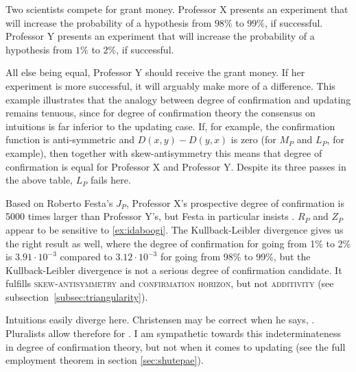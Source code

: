 \documentclass[phd,12pt,oneside]{ubcthesis}
\begin{document}
\begin{quotex}
  \label{ex:idaboogi} Two scientists
  compete for grant money. Professor X presents an experiment that
  will increase the probability of a hypothesis from $98\%$ to $99\%$,
  if successful. Professor Y presents an experiment that will increase
  the probability of a hypothesis from $1\%$ to $2\%$, if successful.
\end{quotex}

All else being equal, Professor Y should receive the grant money. If
her experiment is more successful, it will arguably make more of a
difference. This example illustrates that the analogy between degree
of confirmation and updating remains tenuous, since for degree of
confirmation theory the consensus on intuitions is far inferior to the
updating case. If, for example, the confirmation function is
anti-symmetric and $D(x,y)-D(y,x)$ is zero (for $M_{P}$ and $L_{P}$,
for example), then together with skew-antisymmetry this means that
degree of confirmation is equal for Professor X and Professor Y.
Despite its three passes in the above table, $L_{P}$ fails here.

Based on Roberto Festa's $J_{P}$, Professor X's prospective degree of
confirmation is 5000 times larger than Professor Y's, but Festa in
particular insists 
. $R_{P}$ and $Z_{P}$ appear to be sensitive to
{\xample} \ref{ex:idaboogi}. The Kullback-Leibler divergence gives us
the right result as well, where the degree of confirmation for going
from 1\% to 2\% is $3.91\cdot{}10^{-3}$ compared to
$3.12\cdot{}10^{-3}$ for going from 98\% to 99\%, but the
Kullback-Leibler divergence is not a serious degree of confirmation
candidate. It fulfills \textsc{skew-antisymmetry} and
\textsc{confirmation horizon}, but not \textsc{additivity} (see
subsection~\ref{subsec:triangularity}).

Intuitions easily diverge here. Christensen may be correct when he
says, 
. Pluralists allow therefore for
. I am sym\-path\-etic towards this
indeterminateness in degree of confirmation theory, but not when it
comes to updating (see the full employment theorem in section
\ref{sec:shutepae}).
\end{document}
